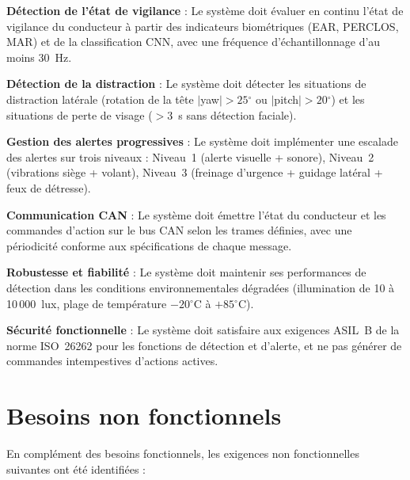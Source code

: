\documentclass[12pt,a4paper]{report}
\newcommand{\degr}{\ensuremath{^{\circ}}}
\begin{document}
\begin{description}[leftmargin=2cm, labelwidth=1.5cm]
  \item[\textbf{F1}] \textbf{D\'etection de l'\'etat de vigilance} : Le syst\`eme doit \'evaluer en continu l'\'etat de vigilance du conducteur \`a partir des indicateurs biom\'etriques (EAR, PERCLOS, MAR) et de la classification CNN, avec une fr\'equence d'\'echantillonnage d'au moins 30~Hz.

  \item[\textbf{F2}] \textbf{D\'etection de la distraction} : Le syst\`eme doit d\'etecter les situations de distraction lat\'erale (rotation de la t\^ete $|$yaw$|>25\degr$ ou $|$pitch$|>20\degr$) et les situations de perte de visage ($>3$~s sans d\'etection faciale).

  \item[\textbf{F3}] \textbf{Gestion des alertes progressives} : Le syst\`eme doit impl\'ementer une escalade des alertes sur trois niveaux : Niveau~1 (alerte visuelle + sonore), Niveau~2 (vibrations si\`ege + volant), Niveau~3 (freinage d'urgence + guidage lat\'eral + feux de d\'etresse).

  \item[\textbf{F4}] \textbf{Communication CAN} : Le syst\`eme doit \'emettre l'\'etat du conducteur et les commandes d'action sur le bus CAN selon les trames d\'efinies, avec une p\'eriodicit\'e conforme aux sp\'ecifications de chaque message.

  \item[\textbf{F5}] \textbf{Robustesse et fiabilit\'e} : Le syst\`eme doit maintenir ses performances de d\'etection dans les conditions environnementales d\'egrad\'ees (illumination de 10 \`a 10\,000~lux, plage de temp\'erature $-20\degr$C \`a $+85\degr$C).

  \item[\textbf{F6}] \textbf{S\'ecurit\'e fonctionnelle} : Le syst\`eme doit satisfaire aux exigences ASIL~B de la norme ISO~26262 pour les fonctions de d\'etection et d'alerte, et ne pas g\'en\'erer de commandes intempestives d'actions actives.
\end{description}

\section{Besoins non fonctionnels}

En compl\'ement des besoins fonctionnels, les exigences non fonctionnelles suivantes ont \'et\'e identifi\'ees :
\end{document}
